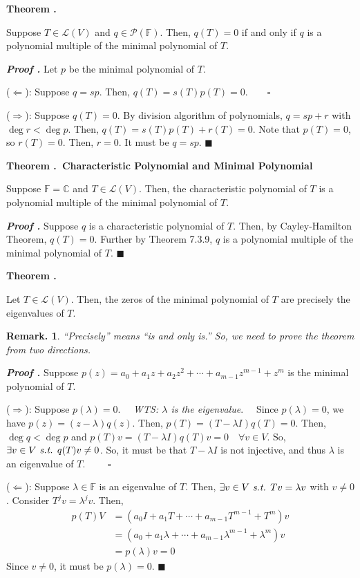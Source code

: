\documentclass[11pt, letterpaper]{article}
\newcounter{index}[subsection]
\newenvironment*{thm}[1]{\begin{tcolorbox}\par\noindent\textbf{Theorem \thesubsection.\stepcounter{index}\theindex\ #1} \par}{\par\end{tcolorbox}}
\newcounter{nprf}[subsection]
\newenvironment*{prf}{\par\indent\textbf{\textit{Proof \stepcounter{nprf}\thenprf.}}}{\hfill$\blacksquare$\par}
\newtheorem*{rmk}{Remark.}
\def\C{\mathbb{C}}
\def\F{\mathbb{F}}
\def\P{\mathcal{P}}
\def\L{\mathcal{L}}
\def\st{\emph{ s.t. }}
\def\pqde{\qquad\square}
\begin{document}
\begin{thm}{}
	Suppose $T\in\L(V)$ and $q\in\P(\F)$. Then, $q(T)=0$ if and only if $q$ is a polynomial multiple of the minimal polynomial of $T$. 
\end{thm}
\begin{prf}
	Let $p$ be the minimal polynomial of $T$. \par 
	($\Leftarrow$): Suppose $q=sp$. Then, $q(T)=s(T)p(T)=0$.$\pqde$\par 
	($\Rightarrow$): Suppose $q(T)=0$. By division algorithm of polynomials, $q=sp+r$ with $\deg r<\deg p$. Then, $q(T)=s(T)p(T)+r(T)=0$. Note that $p(T)=0$, so $r(T)=0$. Then, $r=0$. It must be $q=sp$.	
\end{prf}
\begin{thm}{Characteristic Polynomial and Minimal Polynomial}
	Suppose $\F=\C$ and $T\in\L(V)$. Then, the characteristic polynomial of $T$ is a polynomial multiple of the minimal polynomial of $T$. 	
\end{thm}
\begin{prf}
	Suppose $q$ is a characteristic polynomial of $T$. Then, by Cayley-Hamilton Theorem, $q(T)=0$. Further by Theorem 7.3.9, $q$ is a polynomial multiple of the minimal polynomial of $T$. 
\end{prf}
\begin{thm}{}
	Let $T\in\L(V)$. Then, the zeros of the minimal polynomial of $T$ are precisely the eigenvalues of $T$. 
\end{thm}
\begin{rmk}
	``Precisely'' means ``is and only is.''	 So, we need to prove the theorem from two directions. 
\end{rmk}
\begin{prf}
	Suppose $p(z)=a_0+a_1z+a_2z^2+\cdots+a_{m-1}z^{m-1}+z^m$ is the minimal polynomial of $T$. 
	\par ($\Rightarrow$): Suppose $p(\lambda)=0$. $\quad$\textit{WTS: $\lambda$ is the eigenvalue}.$\quad$ Since $p(\lambda)=0$, we have $p(z)=(z-\lambda)q(z)$. Then, $p(T)=(T-\lambda I)q(T)=0$. Then, $\deg q<\deg p$ and $p(T)v=(T-\lambda I)q(T)v=0\quad\forall v\in V$. So, $\exists v\in V\st q(T)v\neq0$. So, it must be that $T-\lambda I$ is not injective, and thus $\lambda$ is an eigenvalue of $T$. $\pqde$
	\par ($\Leftarrow$): Suppose $\lambda\in\F$ is an eigenvalue of $T$. Then, $\exists v\in V\st Tv=\lambda v$ with $v\neq0$. Consider $T^jv=\lambda^jv$. Then, \[\begin{aligned}p(T)V&=(a_0I+a_1T+\cdots+a_{m-1}T^{m-1}+T^m)v\\&=(a_0+a_1\lambda+\cdots+a_{m-1}\lambda^{m-1}+\lambda^m)v\\&=p(\lambda)v=0\end{aligned}\] Since $v\neq0$, it must be $p(\lambda)=0$.
\end{prf}
\end{document}

